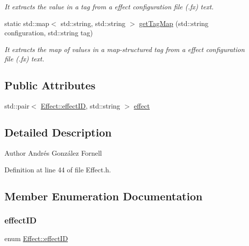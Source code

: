 \begin{DoxyCompactItemize}
\begin{DoxyCompactList}\small\item\em It extracts the value in a tag from a effect configuration file (.fx) text. \end{DoxyCompactList}\item 
static std\+::map$<$ std\+::string, std\+::string $>$ \hyperlink{class_effect_a616281286b866f1f8f6c66715e54ee89}{get\+Tag\+Map} (std\+::string configuration, std\+::string tag)
\begin{DoxyCompactList}\small\item\em It extracts the map of values in a map-\/structured tag from a effect configuration file (.fx) text. \end{DoxyCompactList}\end{DoxyCompactItemize}
\subsection*{Public Attributes}
\begin{DoxyCompactItemize}
\item 
std\+::pair$<$ \hyperlink{class_effect_a6422fe21e9e452943fbc3344884a6fed}{Effect\+::effect\+ID}, std\+::string $>$ \hyperlink{class_effect_ae23ae4e48c344fa374730a9ae24e7ad3}{effect}
\end{DoxyCompactItemize}


\subsection{Detailed Description}
\begin{DoxyAuthor}{Author}
Andrés González Fornell 
\end{DoxyAuthor}


Definition at line 44 of file Effect.\+h.



\subsection{Member Enumeration Documentation}
\mbox{\label{class_effect_a6422fe21e9e452943fbc3344884a6fed}} 
\subsubsection{\texorpdfstring{effect\+ID}{effectID}}
{\footnotesize\ttfamily enum \hyperlink{class_effect_a6422fe21e9e452943fbc3344884a6fed}{Effect\+::effect\+ID}}

